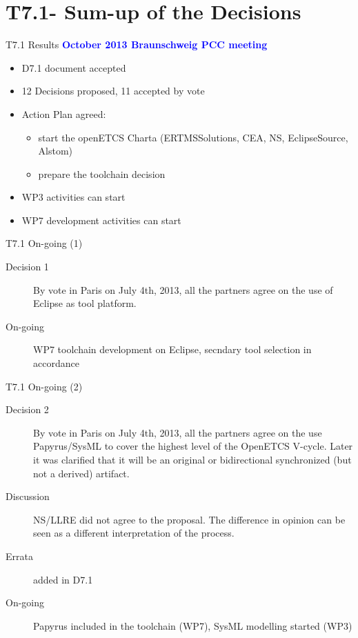 
\section{T7.1- Sum-up of the Decisions}

\begin{frame}{T7.1 Results}
 \textcolor{blue}{\textbf{October 2013 Braunschweig PCC meeting}}
  \begin{itemize}
  \item D7.1 document accepted
  \item
	12 Decisions proposed, 11 accepted by vote     
  \item Action Plan agreed: 
  \begin{itemize}
  \item start the openETCS Charta (ERTMSSolutions, CEA, NS, EclipseSource, Alstom)
  \item prepare the toolchain decision
  \end{itemize} 
  \item WP3 activities can start
  \item WP7 development activities can start
  \end{itemize}
 
\end{frame}

\begin{frame}{T7.1 On-going (1)}

\begin{description}
\item[Decision 1] By vote in Paris on July 4th, 2013, all the partners agree on the use of Eclipse as tool platform.
\item[On-going] WP7 toolchain development on Eclipse, secndary tool selection in accordance
\end{description}
\end{frame}


\begin{frame}{T7.1 On-going (2)}

\begin{description}
\item[Decision 2] By vote in Paris on July 4th, 2013, all the partners agree on the use Papyrus/SysML to cover the highest level of the OpenETCS V-cycle. Later it was clarified that it will be an original or bidirectional synchronized (but not a derived) artifact.
\item[Discussion]  NS/LLRE did not agree to the proposal. The difference in opinion can be seen as a different interpretation of the process.
\item[Errata] added in D7.1
\item[On-going] Papyrus included in the toolchain (WP7), SysML modelling started (WP3)
\end{description}
\end{frame}

